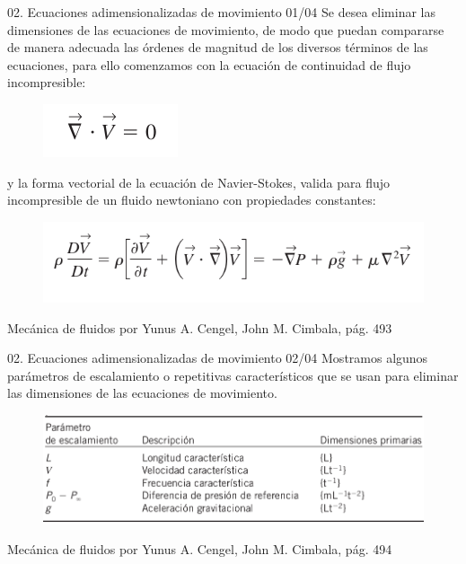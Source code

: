 
\begin{frame}{02. Ecuaciones adimensionalizadas de movimiento 01/04}
\justifying
Se desea eliminar las dimensiones de las ecuaciones de movimiento, de modo que puedan compararse de manera adecuada las órdenes de magnitud de los diversos términos de las ecuaciones, para ello comenzamos con la ecuación de continuidad de flujo incompresible:
\begin{figure}[H]
\centering
\includegraphics[scale=0.2]{Section_Files/S3-imagenes-Jhon/0004.png}
\end{figure}
y la forma vectorial de la ecuación de Navier-Stokes, valida para flujo incompresible de un fluido newtoniano con propiedades constantes:
\begin{figure}[H]
\centering
\includegraphics[scale=0.2]{Section_Files/S3-imagenes-Jhon/0005.png}
\end{figure}
{\tiny Mecánica de fluidos por Yunus A. Cengel, John M. Cimbala, pág. 493}
\end{frame}

\begin{frame}{02. Ecuaciones adimensionalizadas de movimiento 02/04}
\justifying
Mostramos algunos parámetros de escalamiento o repetitivas característicos que se usan para eliminar las dimensiones de las ecuaciones de movimiento.
\begin{figure}[H]
\centering
\includegraphics[scale=0.3]{Section_Files/S3-imagenes-Jhon/0006.png}
\end{figure}
{\tiny Mecánica de fluidos por Yunus A. Cengel, John M. Cimbala, pág. 494}
\end{frame}

